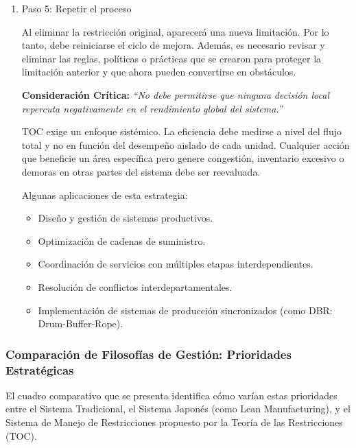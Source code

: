 \documentclass[a4paper,oneside,11pt]{article}
\begin{document}
\begin{enumerate}
    \item Paso 5: Repetir el proceso

    Al eliminar la restricción original, aparecerá una nueva limitación. Por lo tanto, debe reiniciarse el ciclo de mejora. Además, es necesario revisar y eliminar las reglas, políticas o prácticas que se crearon para proteger la limitación anterior y que ahora pueden convertirse en obstáculos.

\textbf{Consideración Crítica:} \textit{“No debe permitirse que ninguna decisión local repercuta negativamente en el rendimiento global del sistema.”}

TOC exige un enfoque sistémico. La eficiencia debe medirse a nivel del flujo total y no en función del desempeño aislado de cada unidad. Cualquier acción que beneficie un área específica pero genere congestión, inventario excesivo o demoras en otras partes del sistema debe ser reevaluada.

Algunas aplicaciones de esta estrategia:

\begin{itemize}
    \item Diseño y gestión de sistemas productivos.
    \item Optimización de cadenas de suministro.
    \item Coordinación de servicios con múltiples etapas interdependientes.
    \item Resolución de conflictos interdepartamentales.
    \item Implementación de sistemas de producción sincronizados (como DBR: Drum-Buffer-Rope).
\end{itemize}

\end{enumerate}


\subsubsection{Comparación de Filosofías de Gestión: Prioridades Estratégicas}

El cuadro comparativo que se presenta identifica cómo varían estas prioridades entre el Sistema Tradicional, el Sistema Japonés (como Lean Manufacturing), y el Sistema de Manejo de Restricciones propuesto por la Teoría de las Restricciones (TOC).
\end{document}
